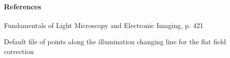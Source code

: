 \documentclass[letterpaper,10pt,english]{sphinxmanual}
\begin{document}
\paragraph{References}

Fundamentals of Light Microscopy and Electronic Imaging, p. 421

\begin{fulllineitems}
\label{api/ClearMap.ImageProcessing:ClearMap.ImageProcessing.IlluminationCorrection.DefaultFlatFieldLineFile}
Default file of points along the illumination changing line for the flat field correction




{\hyperref[api/ClearMap.ImageProcessing:ClearMap.ImageProcessing.IlluminationCorrection.correctIllumination]{\emph{}}}



\end{fulllineitems}

\end{document}
